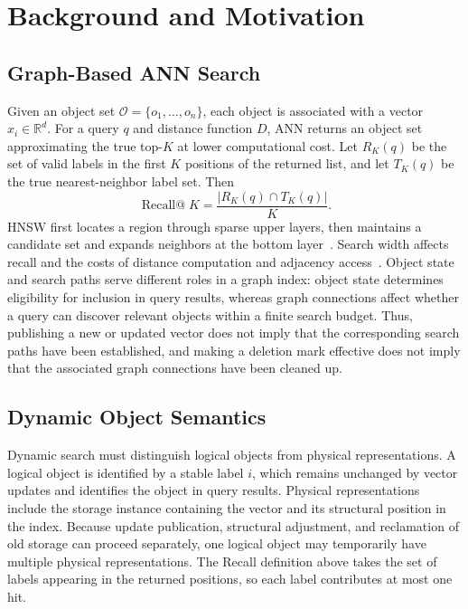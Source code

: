 \documentclass[sigconf,pbalance]{acmart}
\begin{document}
\section{Background and Motivation}
\label{sec:background}

\subsection{Graph-Based ANN Search}
\label{sec:graph-ann}

Given an object set $\mathcal{O}=\{o_1,\ldots,o_n\}$, each object is associated with a vector $x_i\in\mathbb{R}^d$. For a query $q$ and distance function $D$, ANN returns an object set approximating the true top-$K$ at lower computational cost. Let $R_K(q)$ be the set of valid labels in the first $K$ positions of the returned list, and let $T_K(q)$ be the true nearest-neighbor label set. Then
\begin{equation}
\label{eq:recall}
\operatorname{Recall@}K=\frac{|R_K(q)\cap T_K(q)|}{K}.
\end{equation}
HNSW first locates a region through sparse upper layers, then maintains a candidate set and expands neighbors at the bottom layer~\cite{malkov2020hnsw}. Search width affects recall and the costs of distance computation and adjacency access~\cite{aumuller2020annbench,azizi2025grapheval}. Object state and search paths serve different roles in a graph index: object state determines eligibility for inclusion in query results, whereas graph connections affect whether a query can discover relevant objects within a finite search budget. Thus, publishing a new or updated vector does not imply that the corresponding search paths have been established, and making a deletion mark effective does not imply that the associated graph connections have been cleaned up.

\subsection{Dynamic Object Semantics}
\label{sec:dynamic-semantics}

Dynamic search must distinguish logical objects from physical representations. A logical object is identified by a stable label \(i\), which remains unchanged by vector updates and identifies the object in query results. Physical representations include the storage instance containing the vector and its structural position in the index. Because update publication, structural adjustment, and reclamation of old storage can proceed separately, one logical object may temporarily have multiple physical representations. The Recall definition above takes the set of labels appearing in the returned positions, so each label contributes at most one hit.
\end{document}
